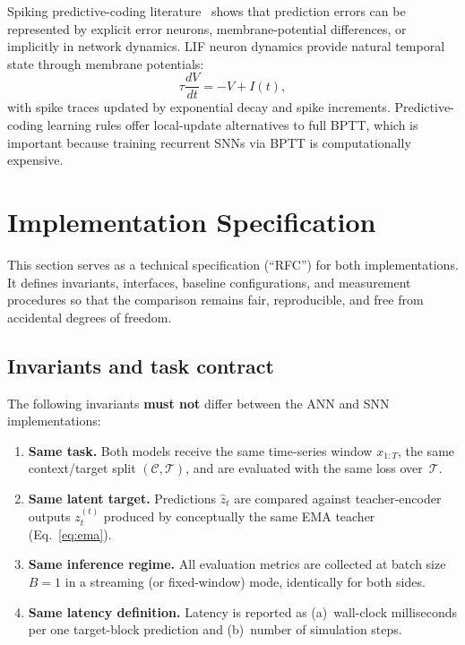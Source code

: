 \documentclass[11pt,a4paper]{article}
\begin{document}
Spiking predictive-coding literature~\cite{rao1999predictive} shows that
prediction errors can be
represented by explicit error neurons, membrane-potential differences, or
implicitly in network dynamics.  LIF neuron dynamics provide natural
temporal state through membrane potentials:
\begin{equation}\label{eq:lif}
\tau \frac{dV}{dt} = -V + I(t),
\end{equation}
with spike traces updated by exponential decay and spike increments.
Predictive-coding learning rules offer local-update alternatives to full
BPTT, which is important because training recurrent SNNs via BPTT is
computationally expensive.

\section{Implementation Specification}\label{sec:impl-spec}

This section serves as a technical specification (``RFC'') for both
implementations.  It defines invariants, interfaces, baseline
configurations, and measurement procedures so that the comparison remains
fair, reproducible, and free from accidental degrees of freedom.

\subsection{Invariants and task contract}\label{sec:invariants}

The following invariants \textbf{must not} differ between the ANN and
SNN implementations:

\begin{enumerate}[label=\textbf{I\arabic*.},nosep]
\item \textbf{Same task.}
  Both models receive the same time-series window $x_{1:T}$, the same
  context/target split $(\mathcal{C},\mathcal{T})$, and are evaluated
  with the same loss over~$\mathcal{T}$.
\item \textbf{Same latent target.}
  Predictions $\hat{z}_t$ are compared against teacher-encoder outputs
  $z_t^{(t)}$ produced by conceptually the same EMA teacher
  (Eq.~\ref{eq:ema}).
\item \textbf{Same inference regime.}
  All evaluation metrics are collected at batch size $B=1$ in a
  streaming (or fixed-window) mode, identically for both sides.
\item \textbf{Same latency definition.}
  Latency is reported as (a)~wall-clock milliseconds per one target-block
  prediction and (b)~number of simulation steps.
\end{enumerate}
\end{document}
